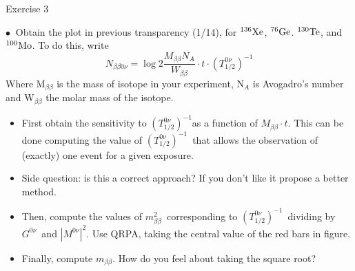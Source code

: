 \documentclass [aspectratio=169]{beamer}
\newcommand{\bbonu}{\ensuremath{\beta\beta0\nu}}
\newcommand{\mbb}{\ensuremath{m_{\beta\beta}}}
\newcommand{\mbbsq}{\ensuremath{m_{\beta\beta}^2}}
\newcommand{\tonu}{\ensuremath{(T_{1/2}^{0\nu})^{-1}}}
\newcommand{\gonu}{\ensuremath{G^{0\nu}}}
\newcommand{\monu}{\ensuremath{|M^{0\nu}|^2}}
\newcommand{\XE}{\ensuremath{{}^{136}{\rm Xe}}}
\newcommand{\GE}{\ensuremath{{}^{76}{\rm Ge}}}
\newcommand{\TE}{\ensuremath{{}^{130}{\rm Te}}}
\newcommand{\MO}{\ensuremath{{}^{100}{\rm Mo}}}
\begin{document}
\begin{frame}{Exercise 3}

$\bullet~$ Obtain the plot in previous transparency (1/14), for \XE, \GE. \TE, and \MO. To do this, write
\[
N_{\bbonu} = \log{2} \frac{M_{\beta\beta} N_A}{W_{\beta\beta}}\cdot t \cdot \tonu
\]
Where M$_{\beta\beta}$ is the mass of isotope in your experiment, N$_A$ is Avogadro's number and
W$_{\beta\beta}$ the molar mass of the isotope. 

\begin{itemize}
\item  {\color{uwopurple} First obtain the sensitivity to \tonu as a function of $ M_{\beta\beta} \cdot t$. This can be done computing the value of \tonu\ that allows the observation of (exactly) one event for a given exposure.}
\item  {\color{uwopurple} Side question: is this a correct approach? If you don't like it propose a better method.}  
\item  {\color{uwopurple} Then, compute the values of \mbbsq\ corresponding to \tonu\ dividing by \gonu\ and \monu. Use QRPA, taking the central value of the red bars in figure. }
\item {\color{uwopurple} Finally, compute \mbb. How do you feel about taking the square root? 
} 
\end{itemize}

\end{frame}




\end{document}
